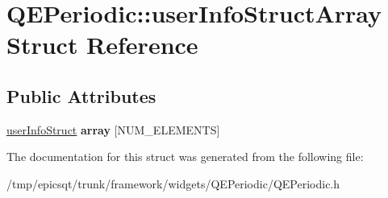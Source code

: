 \hypertarget{structQEPeriodic_1_1userInfoStructArray}{
\section{QEPeriodic::userInfoStructArray Struct Reference}
\label{structQEPeriodic_1_1userInfoStructArray}
}
\subsection*{Public Attributes}
\begin{DoxyCompactItemize}
\item 
\hypertarget{structQEPeriodic_1_1userInfoStructArray_a3a0b161e032e48ccab24814cb6dc2c04}{
\hyperlink{classuserInfoStruct}{userInfoStruct} {\bfseries array} \mbox{[}NUM\_\-ELEMENTS\mbox{]}}
\label{structQEPeriodic_1_1userInfoStructArray_a3a0b161e032e48ccab24814cb6dc2c04}

\end{DoxyCompactItemize}


The documentation for this struct was generated from the following file:\begin{DoxyCompactItemize}
\item 
/tmp/epicsqt/trunk/framework/widgets/QEPeriodic/QEPeriodic.h\end{DoxyCompactItemize}
